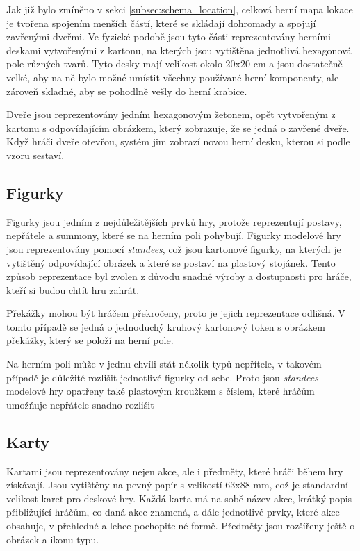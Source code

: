 Jak již bylo zmíněno v sekci \ref{subsec:schema_location}, celková herní mapa lokace je tvořena spojením menších částí, které se skládají dohromady a spojují zavřenými dveřmi. Ve fyzické podobě jsou tyto části reprezentovány herními deskami vytvořenými z kartonu, na kterých jsou vytištěna jednotlivá hexagonová pole různých tvarů. Tyto desky mají velikost okolo 20x20 cm a jsou dostatečně velké, aby na ně bylo možné umístit všechny používané herní komponenty, ale zároveň skladné, aby se pohodlně vešly do herní krabice.

Dveře jsou reprezentovány jedním hexagonovým žetonem, opět vytvořeným z kartonu s odpovídajícím obrázkem, který zobrazuje, že se jedná o zavřené dveře. Když hráči dveře otevřou, systém jim zobrazí novou herní desku, kterou si podle vzoru sestaví.

\subsection{Figurky}
\label{subsec:design_figurines}

Figurky jsou jedním z nejdůležitějších prvků hry, protože reprezentují postavy, nepřátele a summony, které se na herním poli pohybují. Figurky modelové hry jsou reprezentovány pomocí \textit{standees}, což jsou kartonové figurky, na kterých je vytištěný odpovídající obrázek a které se postaví na plastový stojánek. Tento způsob reprezentace byl zvolen z důvodu snadné výroby a dostupnosti pro hráče, kteří si budou chtít hru zahrát.

Překážky mohou být hráčem překročeny, proto je jejich reprezentace odlišná. V tomto případě se jedná o jednoduchý kruhový kartonový token s obrázkem překážky, který se položí na herní pole.

Na herním poli může v jednu chvíli stát několik typů nepřítele, v takovém případě je důležité rozlišit jednotlivé figurky od sebe. Proto jsou \textit{standees} modelové hry opatřeny také plastovým kroužkem s číslem, které hráčům umožňuje nepřátele snadno rozlišit

\subsection{Karty}
\label{subsec:design_cards}

Kartami jsou reprezentovány nejen akce, ale i předměty, které hráči během hry získávají. Jsou vytištěny na pevný papír s velikostí 63x88 mm, což je standardní velikost karet pro deskové hry. Každá karta má na sobě název akce, krátký popis přibližující hráčům, co daná akce znamená, a dále jednotlivé prvky, které akce obsahuje, v přehledné a lehce pochopitelné formě. Předměty jsou rozšířeny ještě o obrázek a ikonu typu.


